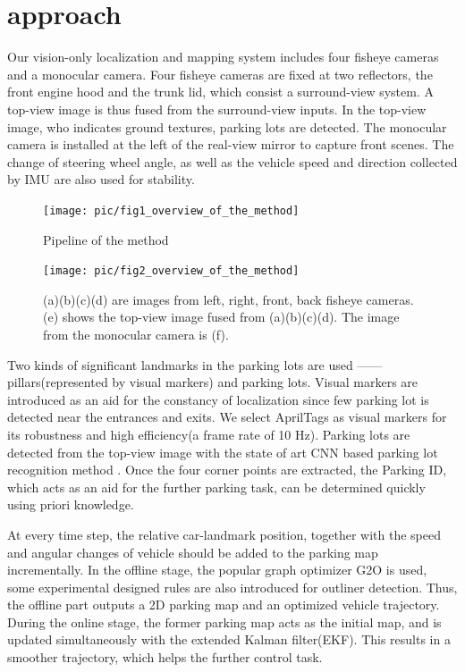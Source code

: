 \documentclass[journal]{IEEEtran}
\begin{document}
\section{approach}

Our vision-only localization and mapping system includes four fisheye cameras and a monocular camera. 
Four fisheye cameras are fixed at two reflectors, the front engine hood and the trunk lid, which consist a surround-view system. 
A top-view image is thus fused from the surround-view inputs. In the top-view image, who indicates ground textures, parking lots are detected. 
The monocular camera is installed at the left of the real-view mirror to capture front scenes. 
The change of steering wheel angle, as well as the vehicle speed and direction collected by IMU are also used for stability.

\begin{figure}[htbp]
\centering
\texttt{[image: pic/fig1\_overview\_of\_the\_method]}
\caption{Pipeline of the method}\label{fig:1}
\end{figure}

\begin{figure}
\centering
\texttt{[image: pic/fig2\_overview\_of\_the\_method]}
\caption{
(a)(b)(c)(d) are images from left, right, front, back fisheye cameras. 
(e) shows the top-view image fused from (a)(b)(c)(d). The image from the monocular camera is (f). 
}\label{fig:2}
\end{figure}

Two kinds of significant landmarks in the parking lots are used ——pillars(represented by visual markers) and parking lots. 
Visual markers are introduced as an aid for the constancy of localization since few parking lot is detected near the entrances and exits. 
We select AprilTags as visual markers for its robustness and high efficiency(a frame rate of 10 Hz). 
Parking lots are detected from the top-view image with the state of art CNN based parking lot recognition method \cite{Li2017Vision}. 
Once the four corner points are extracted, the Parking ID, which acts as an aid for the further parking task, can be determined quickly using priori knowledge.
	

At every time step, the relative car-landmark position, together with the speed and angular changes of vehicle should be added to the parking map incrementally. 
In the offline stage, the popular graph optimizer G2O is used, some experimental designed rules are also introduced for outliner detection. 
Thus, the offline part outputs a 2D parking map and an optimized vehicle trajectory. 
During the online stage, the former parking map acts as the initial map, and is updated simultaneously with the extended Kalman filter(EKF). 
This results in a smoother trajectory, which helps the further control task.
\end{document}
